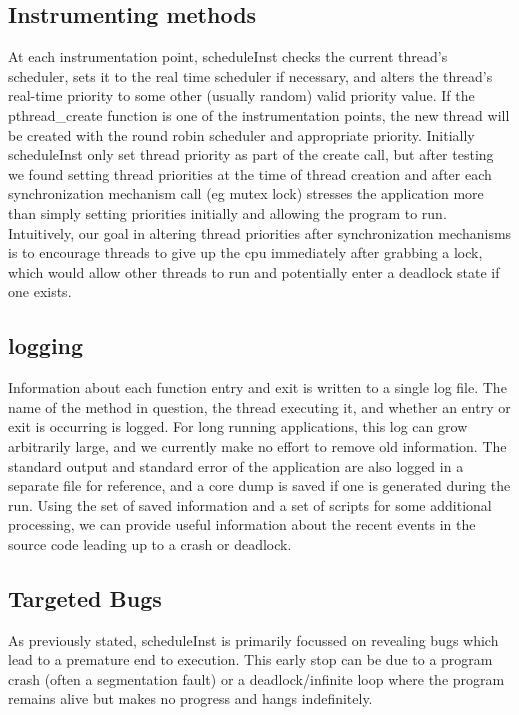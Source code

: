 \documentclass[10pt,]{article} %
\begin{document}
\subsection{Instrumenting methods}

At each instrumentation point, scheduleInst checks the current thread’s scheduler, sets it to the real time scheduler if necessary, and alters the thread’s real-time priority to some other (usually random) valid priority value.  If the pthread\_create function is one of the instrumentation points, the new thread will be created with the round robin scheduler and appropriate priority.  Initially scheduleInst only set thread priority as part of the create call, but after testing we found setting thread priorities at the time of thread creation and after each synchronization mechanism call (eg mutex lock) stresses the application more than simply setting priorities initially and allowing the program to run.  Intuitively, our goal in altering thread priorities after synchronization mechanisms is to encourage threads to give up the cpu immediately after grabbing a lock, which would allow other threads to run and potentially enter a deadlock state if one exists. 



\subsection{logging}

Information about each function entry and exit is written to a single log file.  The name of the method in question, the thread executing it, and whether an entry or exit is occurring is logged.  For long running applications, this log can grow arbitrarily large, and we currently make no effort to remove old information.  The standard output and standard error of the application are also logged in a separate file for reference, and a core dump is saved if one is generated during the run.  Using the set of saved information and a set of scripts for some additional processing, we can provide useful information about the recent events in the source code leading up to a crash or deadlock.


\subsection{Targeted Bugs}

As previously stated, scheduleInst is primarily focussed on revealing bugs which lead to a premature end to execution.  This early stop can be due to a program crash (often a segmentation fault) or a deadlock/infinite loop where the program remains alive but makes no progress and hangs indefinitely.  
\end{document}
